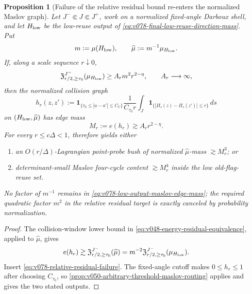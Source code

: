 \documentclass[10pt]{article}
\newtheorem{proposition}[theorem]{Proposition}
\begin{document}
\begin{proposition}[Failure of the relative residual bound re-enters the normalized Maslov graph]
\label{prop:v078-relative-residual-maslov-return}
Let \(J^-\Subset J\Subset J^+\), work on a normalized fixed-angle Darboux shell, and let
\(H_{\rm low}\) be the low-reuse output of
\eqref{eq:v078-final-low-reuse-direction-mass}.  Put
\[
m:=\mu(H_{\rm low}),
\qquad
\widehat\mu:=m^{-1}\mu_{H_{\rm low}}.
\]
If, along a scale sequence \(r\downarrow0\),
\begin{equation}
\label{eq:v078-relative-residual-failure}
\mathfrak Z_{r/2,\ge\tau_0}^{J^-}(\mu_{H_{\rm low}})
\ge
A_r m^2r^{2-\eta},
\qquad
A_r\longrightarrow\infty,
\end{equation}
then the normalized collision graph
\begin{equation}
\label{eq:v078-low-output-normalized-maslov-graph}
h_r(z,z')
:=
\mathbf 1_{\{\tau_0\le|a-a'|\le C_U\}}
\frac1{C_{\tau_0}r}
\int_J
\mathbf 1_{\{|\Pi_s(z)-\Pi_s(z')|\le r\}}\,ds
\end{equation}
on \((H_{\rm low},\widehat\mu)\) has edge mass
\begin{equation}
\label{eq:v078-low-output-maslov-edge-mass}
\boxed{
M_r:=e(h_r)
\gtrsim
A_r r^{2-\eta}.
}
\end{equation}
For every \(r\le c\Delta<1\),  therefore yields either
\begin{enumerate}[label=\textnormal{(\roman*)}]
\item an \(O(r/\Delta)\)-Lagrangian point-probe bush of normalized
\(\widehat\mu\)-mass \(\gtrsim M_r^3\); or
\item determinant-small Maslov four-cycle content \(\gtrsim M_r^4\) inside the low old-flag-reuse
set.
\end{enumerate}
No factor of \(m^{-1}\) remains in \eqref{eq:v078-low-output-maslov-edge-mass}; the required
quadratic factor \(m^2\) in the relative residual target is exactly canceled by probability
normalization.
\end{proposition}

\begin{proof}
The collision-window lower bound in
\eqref{eq:v048-energy-residual-equivalence}, applied to \(\widehat\mu\), gives
\[
e(h_r)
\gtrsim
\mathfrak Z_{r/2,\ge\tau_0}^{J^-}(\widehat\mu)
=
m^{-2}\mathfrak Z_{r/2,\ge\tau_0}^{J^-}(\mu_{H_{\rm low}}).
\]
Insert \eqref{eq:v078-relative-residual-failure}.  The fixed-angle cutoff makes
\(0\le h_r\le1\) after choosing \(C_{\tau_0}\), so
\cref{prop:v050-arbitrary-threshold-maslov-routing} applies and gives the two stated outputs.
\end{proof}
\end{document}
